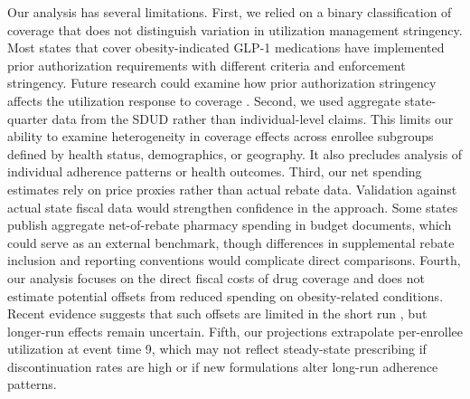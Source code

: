 Our analysis has several limitations. First, we relied on a binary classification of coverage that does not distinguish variation in utilization management stringency. Most states that cover obesity-indicated GLP-1 medications have implemented prior authorization requirements with different criteria and enforcement stringency. Future research could examine how prior authorization stringency affects the utilization response to coverage \citep{liu2024state, klebanoff2025medicaid}. Second, we used aggregate state-quarter data from the SDUD rather than individual-level claims. This limits our ability to examine heterogeneity in coverage effects across enrollee subgroups defined by health status, demographics, or geography. It also precludes analysis of individual adherence patterns or health outcomes. Third, our net spending estimates rely on price proxies rather than actual rebate data. Validation against actual state fiscal data would strengthen confidence in the approach. Some states publish aggregate net-of-rebate pharmacy spending in budget documents, which could serve as an external benchmark, though differences in supplemental rebate inclusion and reporting conventions would complicate direct comparisons. Fourth, our analysis focuses on the direct fiscal costs of drug coverage and does not estimate potential offsets from reduced spending on obesity-related conditions. Recent evidence suggests that such offsets are limited in the short run \citep{wing2026glp1, zhang2026glp1, wennberg2025glp1}, but longer-run effects remain uncertain. Fifth, our projections extrapolate per-enrollee utilization at event time 9, which may not reflect steady-state prescribing if discontinuation rates are high or if new formulations alter long-run adherence patterns.


